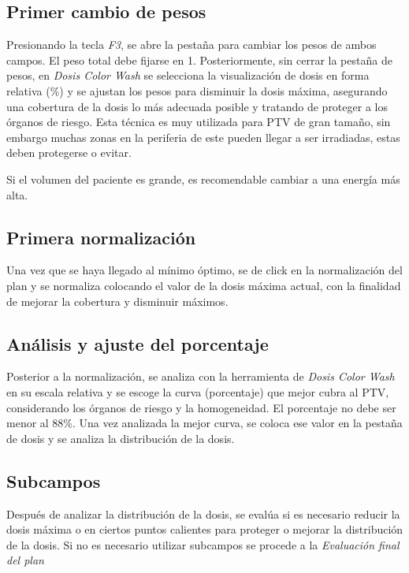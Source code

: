 \documentclass{article}
\begin{document}
\subsection{Primer cambio de pesos}

Presionando la tecla \textit{F3}, se abre la pestaña para cambiar los pesos de ambos campos. El peso total debe fijarse en 1. Posteriormente, sin cerrar la pestaña de pesos, en \textit{Dosis Color Wash} se selecciona la visualización de dosis en forma relativa (\%) y se ajustan los pesos para disminuir la dosis máxima, asegurando una cobertura de la dosis lo más adecuada posible y tratando de proteger a los órganos de riesgo. Esta técnica es muy utilizada para PTV de gran tamaño, sin embargo muchas zonas en la periferia de este pueden llegar a ser irradiadas, estas deben protegerse o evitar.

Si el volumen del paciente es grande, es recomendable cambiar a una energía más alta.

\subsection{Primera normalización}

Una vez que se haya llegado al mínimo óptimo, se de click en la normalización del plan y se normaliza colocando el valor de la dosis máxima actual, con la finalidad de mejorar la cobertura y disminuir máximos.

\subsection{Análisis y ajuste del porcentaje}

Posterior a la normalización, se analiza con la herramienta de \textit{Dosis Color Wash} en su escala relativa y se escoge la curva (porcentaje) que mejor cubra al PTV, considerando los órganos de riesgo y la homogeneidad. El porcentaje no debe ser menor al 88\%. Una vez analizada la mejor curva, se coloca ese valor en la pestaña de dosis y se analiza la distribución de la dosis.

\subsection{Subcampos}

Después de analizar la distribución de la dosis, se evalúa si es necesario reducir la dosis máxima o en ciertos puntos calientes para proteger o mejorar la distribución de la dosis. Si no es necesario utilizar subcampos se procede a la \textit{Evaluación final del plan}
\end{document}

